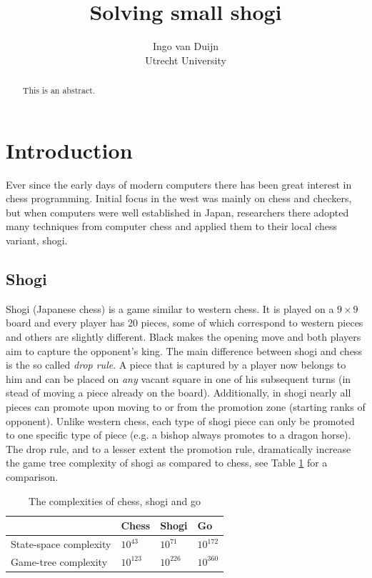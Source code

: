 \documentclass{article}
\title{Solving small shogi}%
\author{Ingo van Duijn \\ Utrecht University}
\begin{document}
\maketitle

\begin{abstract}
This is an abstract.
\end{abstract}

\section{Introduction}
Ever since the early days of modern computers there has been great interest in chess programming. Initial
focus in the west was mainly on chess and checkers, but when computers were well established in Japan, researchers there adopted
many techniques from computer chess and applied them to their local chess variant, shogi.

\subsection{Shogi}
Shogi (Japanese chess\cite{shogibook}) is a game similar to western chess. It is played on a $9 \times 9$ board and every
player has 20 pieces, some of which correspond to western pieces and others are slightly different.
Black makes the opening move and both players aim to capture the opponent's king.
The main difference between shogi and chess is the so called \emph{drop rule}.
A piece that is captured by a player now belongs to him and can be placed on \textit{any} vacant square in one of his subsequent turns
(in stead of moving a piece already on the board).
Additionally, in shogi nearly all pieces can promote upon moving to or from the promotion zone (starting ranks of opponent).
Unlike western chess, each type of shogi piece can only be promoted to one specific type of piece (e.g. a bishop always promotes to a dragon horse).
The drop rule, and to a lesser extent the promotion rule, dramatically increase the game tree complexity of shogi as compared to chess, see Table
\ref{table:complex} for a comparison.\\
\begin{table}
\center
\begin{tabular}{l l l l}
 & Chess & Shogi & Go \\ \hline
State-space complexity & $10^{43}$ & $10^{71}$ & $10^{172}$ \\
Game-tree complexity & $10^{123}$ & $10^{226}$ & $10^{360}$ \\ \hline
\end{tabular}
\caption{The complexities of chess, shogi and go}
\label{table:complex}
\end{table}
\end{document}
